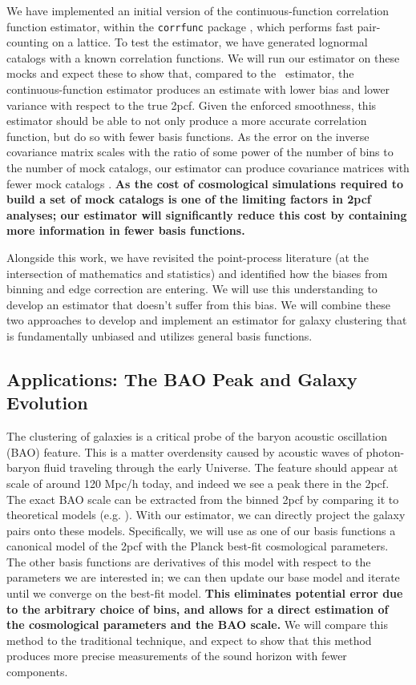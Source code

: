 \documentclass[12pt, fullpage, letterpaper]{article}
\newcommand{\cf}{2pcf\xspace}
\newcommand{\LS}{\acronym{LS}\xspace}
\begin{document}
We have implemented an initial version of the continuous-function correlation function estimator, within the \texttt{corrfunc} package \citep{Sinha2017}, which performs fast pair-counting on a lattice.
To test the estimator, we have generated lognormal catalogs with a known correlation functions. 
We will run our estimator on these mocks and expect these to show that, compared to the \LS\
  estimator, the continuous-function estimator produces an estimate with lower bias and
  lower variance with respect to the true \cf.
Given the enforced smoothness, this estimator should be able to not only produce a more accurate correlation function, but do so with fewer basis functions.
As the error on the inverse covariance matrix scales with the ratio of some power of the number of bins to the number of mock catalogs, our estimator can produce covariance matrices with fewer mock catalogs \citep{Hartlap2007}.
\textbf{As the cost of cosmological simulations required to build a set of mock catalogs is one of the limiting factors in \cf analyses; our estimator will significantly reduce this cost by containing more information in fewer basis functions.}

Alongside this work, we have revisited the point-process literature (at the intersection of mathematics and statistics) and identified how the biases from binning and edge correction are entering. 
We will use this understanding to develop an estimator that doesn't suffer from this bias.
We will combine these two approaches to develop and implement an estimator for galaxy clustering that is fundamentally unbiased and utilizes general basis functions.

\subsection{Applications: The BAO Peak and Galaxy Evolution}

The clustering of galaxies is a critical probe of the baryon acoustic oscillation (BAO) feature. 
This is a matter overdensity caused by acoustic waves of photon-baryon fluid traveling through the early Universe. 
The feature should appear at scale of around 120 Mpc/h today, and indeed we see a peak there in the \cf \citep{Eisenstein2005}. 
The exact BAO scale can be extracted from the binned \cf by comparing it to theoretical models (e.g. \citealt{Anderson2014}). 
With our estimator, we can directly project the galaxy pairs onto these models. 
Specifically, we will use as one of our basis functions a canonical model of the \cf with the Planck best-fit cosmological parameters. 
The other basis functions are derivatives of this model with respect to the parameters we are interested in; we can then update our base model and iterate until we converge on the best-fit model.
\textbf{This eliminates potential error due to the arbitrary choice of bins, and allows for a direct estimation of the cosmological parameters and the BAO scale.}
We will compare this method to the traditional technique, and expect to show that this method produces more precise measurements of the sound horizon with fewer components.
\end{document}
